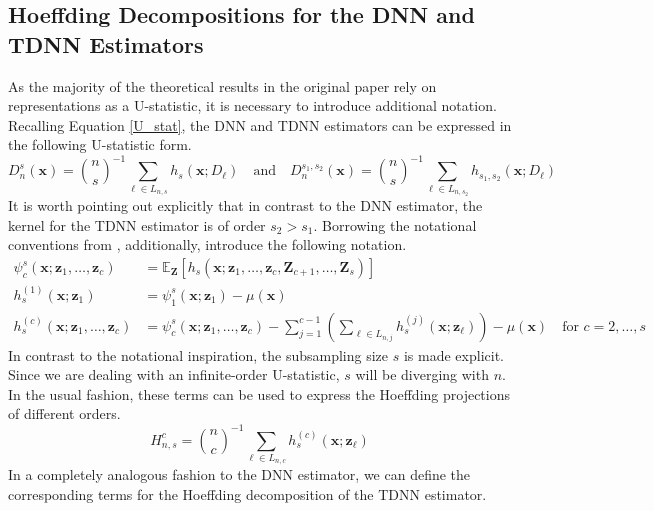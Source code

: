 \documentclass[letterpaper,10pt]{article}
\numberwithin{equation}{section}
\numberwithin{theorem}{section}
\numberwithin{remark}{section}
\numberwithin{example}{section}
\theoremstyle{definition}
\newcommand{\1}{\mathbb{1}}
\begin{document}
\subsection{Hoeffding Decompositions for the DNN and TDNN Estimators}
As the majority of the theoretical results in the original paper rely on representations as a U-statistic, it is necessary to introduce additional notation.
Recalling Equation \ref{U_stat}, the DNN and TDNN estimators can be expressed in the following U-statistic form.
\begin{equation}
	D_{n}^{s}(\mathbf{x})
	= \binom{n}{s}^{-1} \sum_{\ell \in L_{n,s}} h_{s}(\mathbf{x}; D_{\ell})
	\quad \text{and} \quad
	D_{n}^{s_1, s_2}(\mathbf{x})
	= \binom{n}{s}^{-1} \sum_{\ell \in L_{n,s_2}} h_{s_1, s_2}(\mathbf{x}; D_{\ell})
\end{equation}
It is worth pointing out explicitly that in contrast to the DNN estimator, the kernel for the TDNN estimator is of order $s_2 > s_1$.
Borrowing the notational conventions from \citet{lee_u-statistics_2019}, additionally, introduce the following notation.
\begin{align}
	\psi_{c}^{s}(\mathbf{x}; \mathbf{z}_{1}, \dotsc, \mathbf{z}_{c})
	 & = \mathbb{E}_{\mathbf{Z}}\left[h_{s}\left(\mathbf{x}; \mathbf{z}_{1}, \dotsc, \mathbf{z}_{c}, \mathbf{Z}_{c+1}, \dotsc, \mathbf{Z}_{s}\right)\right]                                    \\
	h_{s}^{(1)}\left(\mathbf{x}; \mathbf{z}_{1}\right)
	 & = \psi_{1}^{s}(\mathbf{x}; \mathbf{z}_{1}) - \mu(\mathbf{x})                                                                                                                            \\
	h_{s}^{(c)}\left(\mathbf{x}; \mathbf{z}_{1}, \dotsc, \mathbf{z}_{c}\right)
	 & = \psi_{c}^{s}(\mathbf{x}; \mathbf{z}_{1}, \dotsc, \mathbf{z}_{c}) - \sum_{j = 1}^{c-1}\left(\sum_{\ell \in L_{n,j}}h_{s}^{(j)}(\mathbf{x}; \mathbf{z}_{\ell})\right) - \mu(\mathbf{x})
	\quad \text{for } c = 2, \dotsc, s
\end{align}
In contrast to the notational inspiration, the subsampling size $s$ is made explicit.
Since we are dealing with an infinite-order U-statistic, $s$ will be diverging with $n$.
In the usual fashion, these terms can be used to express the Hoeffding projections of different orders.
\begin{equation}
	H_{n,s}^{c}
	= \binom{n}{c}^{-1} \sum_{\ell \in L_{n,c}} h^{(c)}_{s}(\mathbf{x}; \mathbf{z}_{\ell})
\end{equation}
In a completely analogous fashion to the DNN estimator, we can define the corresponding terms for the Hoeffding decomposition of the TDNN estimator.
\end{document}
